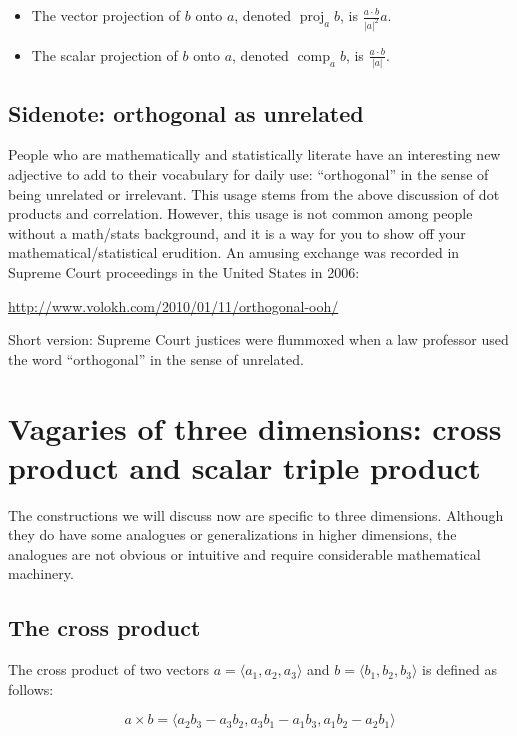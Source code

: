 \documentclass[10pt]{amsart}
\begin{document}
\begin{itemize}
\item The vector projection of $b$ onto $a$, denoted
  $\operatorname{proj}_ab$, is $\frac{a \cdot b}{|a|^2} a$.
\item The scalar projection of $b$ onto $a$, denoted
  $\operatorname{comp}_ab$, is $\frac{a \cdot b}{|a|}$.
\end{itemize}

\subsection{Sidenote: orthogonal as unrelated}

People who are mathematically and statistically literate have an
interesting new adjective to add to their vocabulary for daily use:
``orthogonal'' in the sense of being unrelated or irrelevant. This
usage stems from the above discussion of dot products and
correlation. However, this usage is not common among people without a
math/stats background, and it is a way for you to show off your
mathematical/statistical erudition. An amusing exchange was recorded
in Supreme Court proceedings in the United States in 2006:

\url{http://www.volokh.com/2010/01/11/orthogonal-ooh/}

Short version: Supreme Court justices were flummoxed when a law professor used the word ``orthogonal'' in the sense of unrelated.

\section{Vagaries of three dimensions: cross product and scalar triple product}

The constructions we will discuss now are specific to three
dimensions. Although they do have some analogues or generalizations in
higher dimensions, the analogues are not obvious or intuitive and
require considerable mathematical machinery.

\subsection{The cross product}

The cross product of two vectors $a = \langle a_1, a_2, a_3 \rangle$ and
$b = \langle b_1, b_2, b_3 \rangle$ is defined as follows:

$$a \times b = \langle a_2b_3 - a_3b_2, a_3b_1 - a_1b_3, a_1b_2 - a_2b_1 \rangle$$
\end{document}
